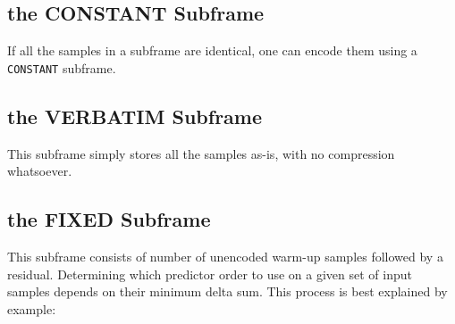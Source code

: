 \subsection{the CONSTANT Subframe}

If all the samples in a subframe are identical, one can encode them
using a \texttt{CONSTANT} subframe.

\subsection{the VERBATIM Subframe}

This subframe simply stores all the samples as-is,
with no compression whatsoever.

\subsection{the FIXED Subframe}

This subframe consists of  number of unencoded
warm-up samples followed by a residual.
Determining which predictor order to use on a given set of input samples
depends on their minimum delta sum.
This process is best explained by example:

